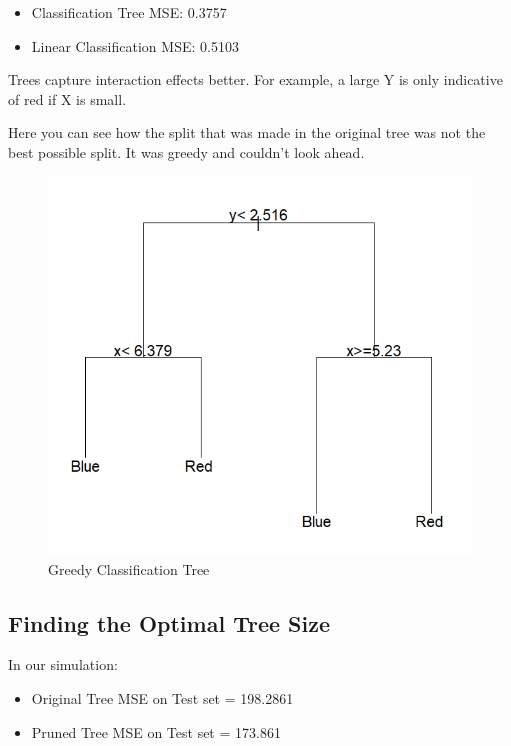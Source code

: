 \documentclass[12pt]{article}
\begin{document}
\begin{itemize}
    \item Classification Tree MSE: 0.3757
    \item Linear Classification MSE: 0.5103
\end{itemize}

Trees capture interaction effects better. For example, a large Y is only indicative of red if X is small.




Here you can see how the split that was made in the original tree was not the best possible split. It was greedy and couldn't look ahead.



\begin{figure}
    \centering
    \includegraphics[scale=0.50]{Greedy Classification Tree.png}
    \caption{Greedy Classification Tree}
    \label{fig:sub3}  %
\end{figure}%


\subsection{Finding the Optimal Tree Size}
In our simulation:
\begin{itemize}
    \item Original Tree MSE on Test set = 198.2861 
    \item Pruned Tree MSE on Test set = 173.861 
\end{itemize}
\end{document}
